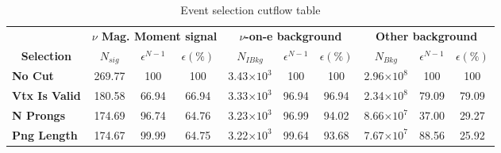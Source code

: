 \begin{table}[!hb]
\caption{Event selection cutflow table}
\begin{tabular}{|l|ccc|ccc|ccc|}\hline
\multicolumn{1}{|c|}{}                                     & \multicolumn{3}{c|}{\textbf{$\nu$ Mag. Moment signal}}          & \multicolumn{3}{c|}{\textbf{$\nu$-on-e background}}                      & \multicolumn{3}{c|}{\textbf{Other background}}                           \\
\multicolumn{1}{|c|}{\multirow{-2}{*}{\textbf{Selection}}} & \multicolumn{1}{c}{\textbf{$N_{sig}$}} & \textbf{$\epsilon^{N-1}$} & \textbf{$\epsilon \left(\%\right)$} & \multicolumn{1}{c}{\textbf{$N_{IBkg}$}} & \textbf{$\epsilon^{N-1}$} & \textbf{$\epsilon \left(\%\right)$} & \multicolumn{1}{c}{\textbf{$N_{Bkg}$}} & \textbf{$\epsilon^{N-1}$} & \textbf{$\epsilon \left(\%\right)$} \\\hline
\textbf{No Cut}      & 269.77            & 100 & 100 & 3.43$\times 10^3$           & 100 & 100                                     & 2.96$\times 10^8$          & 100                                                             & 100                                    \\
\textbf{Vtx Is Valid}  & 180.58            & 66.94                                                              & 66.94                                     & 3.33$\times 10^3$               & 96.94                                                               & 96.94                                      & 2.34$\times 10^8$          & 79.09                                                              & 79.09                                     \\
\textbf{N Prongs}        & 174.69            & 96.74                                                              & 64.76                                     & 3.23$\times 10^3$                             & 96.99                                                               & 94.02                                      & 8.66$\times 10^7$                     & 37.00                                                                 & 29.27                                     \\
\textbf{Png Length}  & 174.67            & 99.99                                                              & 64.75                                     & 3.22$\times 10^3$                                          & 99.64                                                               & 93.68                                      & 7.67$\times 10^7$                              & 88.56                                                              & 25.92                                     \\

\end{tabular}
\end{table}
